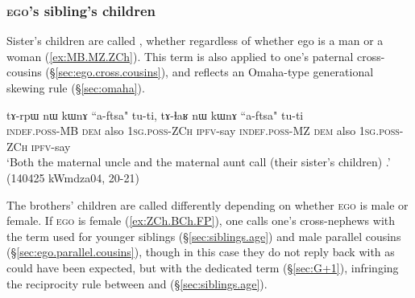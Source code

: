 \subsubsection{\textsc{ego}'s sibling's children} \label{sec:nephews}
Sister's children are called , whether regardless of whether ego is a man or a woman (\ref{ex:MB.MZ.ZCh}). This term is also applied to one's paternal cross-cousins (§\ref{sec:ego.cross.cousins}), and reflects an Omaha-type generational skewing rule (§\ref{sec:omaha}).

\begin{exe}
\ex \label{ex:MB.MZ.ZCh}
\gll tɤ-rpɯ nɯ kɯnɤ ``a-ftsa" tu-ti, tɤ-ɬaʁ nɯ kɯnɤ ``a-ftsa" tu-ti \\
\textsc{indef}.\textsc{poss}-MB \textsc{dem} also \textsc{1sg}.\textsc{poss}-\textsc{ZCh} \textsc{ipfv}-say \textsc{indef}.\textsc{poss}-MZ \textsc{dem} also \textsc{1sg}.\textsc{poss}-\textsc{ZCh} \textsc{ipfv}-say \\
\glt `Both the maternal uncle and the maternal aunt call (their sister's children) .'  (140425 kWmdza04, 20-21)
\end{exe}

The brothers' children are called differently depending on whether \textsc{ego} is male or female. If \textsc{ego} is female (\ref{ex:ZCh.BCh.FP}), one calls one's cross-nephews with the term  used for younger siblings (§\ref{sec:siblings.age}) and male parallel cousins (§\ref{sec:ego.parallel.cousins}), though in this case they do not reply back with  as could have been expected, but with the dedicated term  (§\ref{sec:G+1}), infringing the reciprocity rule between  and  (§\ref{sec:siblings.age}).


